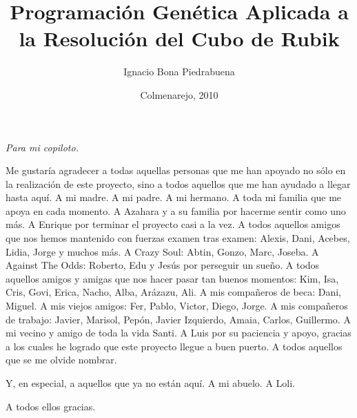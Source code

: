 \documentclass[11pt,spanish,UC3MThesis]{PhdThesis}
\title{Programación Genética Aplicada a la Resolución del Cubo de Rubik}
\author{Ignacio Bona Piedrabuena}
\date{Colmenarejo, 2010}
\begin{document}
\renewcommand{\tablename}{Tabla} 
\pagestyle{serif}

\maketitle
 \begin{dedication}
 	\textit{Para mi copiloto.}
 \end{dedication}
\begin{acknowledgments}
 	Me gustaría agradecer a todas aquellas personas que me han apoyado no sólo
 	en la realización de este proyecto, sino a todos aquellos que me han ayudado
 	a llegar hasta aquí. A mi madre. A mi padre. A mi hermano. A toda mi familia
 	que me apoya en cada momento. A Azahara y a su familia por hacerme sentir
 	como uno más. A Enrique por terminar el proyecto casi a la vez. A todos
 	aquellos amigos que nos hemos mantenido con fuerzas examen tras
 	examen: Alexis, Dani, Acebes, Lidia, Jorge y muchos más. A Crazy Soul: Abtin,
 	Gonzo, Marc, Joseba. A Against The Odds: Roberto, Edu y Jesús por perseguir
 	un sueño. A todos aquellos amigos y amigas que nos hacer pasar tan buenos
 	momentos: Kim, Isa, Cris, Govi, Erica, Nacho, Alba, Arázazu, Ali. A mis
 	compañeros de beca: Dani, Miguel. A mis viejos amigos: Fer, Pablo, Victor, Diego, Jorge. A mis
compañeros de trabajo: Javier, Marisol, Pepón, Javier Izquierdo, Amaia,
 	Carlos, Guillermo. A mi vecino y amigo de toda la vida Santi. A Luis por su paciencia y apoyo, gracias a los
 	cuales he logrado que este proyecto llegue a buen puerto. A todos
 	aquellos que se me olvide nombrar.
 	
 	Y, en especial, a aquellos que ya no están aquí. A mi abuelo. A Loli.
 	
 	A todos ellos gracias.
\end{acknowledgments}
\frontmatter 
\tableofcontents



\mainmatter

% 








\backmatter


\small



\appendix

\end{document}
